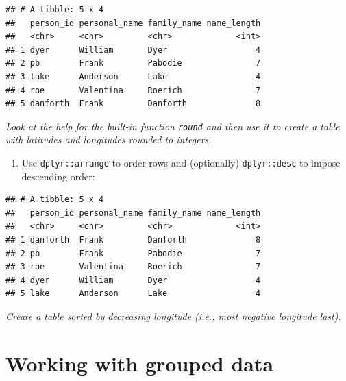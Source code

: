 \documentclass[]{Nemilov}
\newenvironment{Shaded}{\begin{snugshade}}{\end{snugshade}}
\newcommand{\DataTypeTok}[1]{\textcolor[rgb]{0.13,0.29,0.53}{#1}}
\newcommand{\KeywordTok}[1]{\textcolor[rgb]{0.13,0.29,0.53}{\textbf{#1}}}
\newcommand{\NormalTok}[1]{#1}
\newcommand{\OperatorTok}[1]{\textcolor[rgb]{0.81,0.36,0.00}{\textbf{#1}}}
\newcommand{\StringTok}[1]{\textcolor[rgb]{0.31,0.60,0.02}{#1}}
\providecommand{\tightlist}{%
  \setlength{\itemsep}{0pt}\setlength{\parskip}{0pt}}
\begin{document}
\begin{verbatim}
## # A tibble: 5 x 4
##   person_id personal_name family_name name_length
##   <chr>     <chr>         <chr>             <int>
## 1 dyer      William       Dyer                  4
## 2 pb        Frank         Pabodie               7
## 3 lake      Anderson      Lake                  4
## 4 roe       Valentina     Roerich               7
## 5 danforth  Frank         Danforth              8
\end{verbatim}

\emph{Look at the help for the built-in function \texttt{round} and then use it to create a table with latitudes and longitudes rounded to integers.}

\begin{enumerate}
\def\labelenumi{\arabic{enumi}.}
\setcounter{enumi}{9}
\tightlist
\item
  Use \texttt{dplyr::arrange} to order rows and (optionally) \texttt{dplyr::desc} to impose descending order:
\end{enumerate}

\begin{Shaded}
\end{Shaded}

\begin{verbatim}
## # A tibble: 5 x 4
##   person_id personal_name family_name name_length
##   <chr>     <chr>         <chr>             <int>
## 1 danforth  Frank         Danforth              8
## 2 pb        Frank         Pabodie               7
## 3 roe       Valentina     Roerich               7
## 4 dyer      William       Dyer                  4
## 5 lake      Anderson      Lake                  4
\end{verbatim}

\emph{Create a table sorted by decreasing longitude (i.e., most negative longitude last).}

\hypertarget{working-with-grouped-data}{%
\section{Working with grouped data}\label{working-with-grouped-data}}
\end{document}
